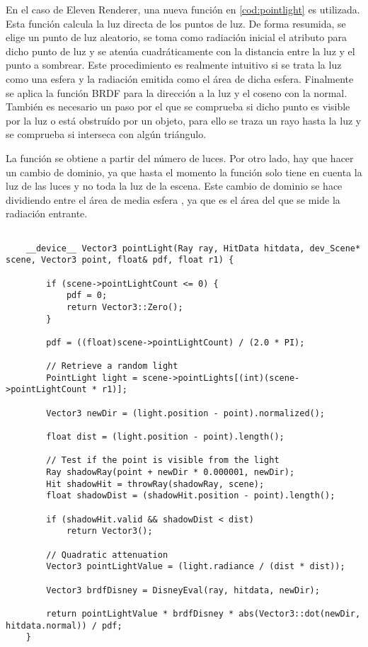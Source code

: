 En el caso de Eleven Renderer, una nueva función  en \autoref{cod:pointlight} es utilizada. Esta función calcula la luz directa de los puntos de luz. De forma resumida, se elige un punto de luz aleatorio, se toma como radiación inicial el atributo  para dicho punto de luz y se atenúa cuadráticamente con la distancia entre la luz y el punto a sombrear. Este procedimiento es realmente intuitivo si se trata la luz como una esfera y la radiación emitida como el área de dicha esfera. Finalmente se aplica la función BRDF para la dirección a la luz y el coseno con la normal. También es necesario un paso por el que se comprueba si dicho punto es visible por la luz o está obstruído por un objeto, para ello se traza un rayo hasta la luz y se comprueba si interseca con algún triángulo.

La función  se obtiene a partir del número de luces. Por otro lado, hay que hacer un cambio de dominio, ya que hasta el momento la función  solo tiene en cuenta la luz de las luces y no toda la luz de la escena. Este cambio de dominio se hace dividiendo entre el área de media esfera , ya que es el área del que se mide la radiación entrante.

\begin{minipage}[c]{0.95\textwidth}
\begin{lstlisting}[label={cod:pointlight}, caption={Código de iluminación por luces puntuales}]
	
	__device__ Vector3 pointLight(Ray ray, HitData hitdata, dev_Scene* scene, Vector3 point, float& pdf, float r1) {

		if (scene->pointLightCount <= 0) {
			pdf = 0;
			return Vector3::Zero();
		}

		pdf = ((float)scene->pointLightCount) / (2.0 * PI);

		// Retrieve a random light
		PointLight light = scene->pointLights[(int)(scene->pointLightCount * r1)];

		Vector3 newDir = (light.position - point).normalized();
		
		float dist = (light.position - point).length();

		// Test if the point is visible from the light
		Ray shadowRay(point + newDir * 0.000001, newDir);
		Hit shadowHit = throwRay(shadowRay, scene);
		float shadowDist = (shadowHit.position - point).length();

		if (shadowHit.valid && shadowDist < dist)
			return Vector3();

		// Quadratic attenuation
		Vector3 pointLightValue = (light.radiance / (dist * dist));

		Vector3 brdfDisney = DisneyEval(ray, hitdata, newDir);

		return pointLightValue * brdfDisney * abs(Vector3::dot(newDir, hitdata.normal)) / pdf;
	}
	
\end{lstlisting}
\end{minipage}

